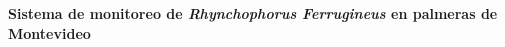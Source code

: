 \begin{titlepage}

    \begin{flushright}
        \setlength{\rightskip}{-2cm} %
        \vspace*{7.5cm} %

        {\bfseries\fontsize{33pt}{40pt}\selectfont
        Sistema de monitoreo de \textit{Rhynchophorus Ferrugineus} en palmeras de Montevideo} \\[1.5cm]


\end{flushright}
\end{titlepage}

